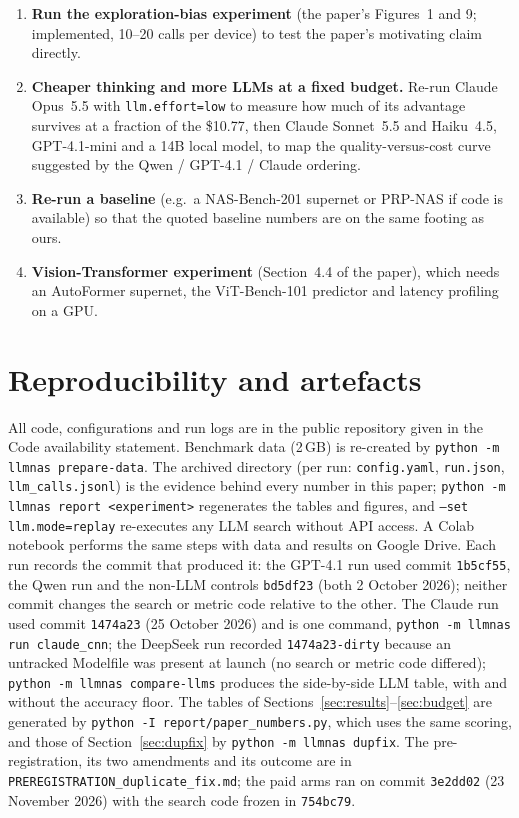 \documentclass[pdflatex,sn-mathphys-ay]{sn-jnl}
\newcommand{\code}[1]{\texttt{#1}}
\begin{document}
\begin{enumerate}
  \item \textbf{Run the exploration-bias experiment} (the paper's Figures~1 and 9; implemented, 10--20 calls per device) to test the paper's motivating claim directly.
  \item \textbf{Cheaper thinking and more LLMs at a fixed budget.} Re-run Claude Opus~5.5 with \code{llm.effort=low} to measure how much of its advantage survives at a fraction of the \$10.77, then Claude Sonnet~5.5 and Haiku~4.5, GPT-4.1-mini and a 14B local model, to map the quality-versus-cost curve suggested by the Qwen / GPT-4.1 / Claude ordering.
  \item \textbf{Re-run a baseline} (e.g.\ a NAS-Bench-201 supernet or PRP-NAS if code is available) so that the quoted baseline numbers are on the same footing as ours.
  \item \textbf{Vision-Transformer experiment} (Section~4.4 of the paper), which needs an AutoFormer supernet, the ViT-Bench-101 predictor and latency profiling on a GPU.
\end{enumerate}

\section{Reproducibility and artefacts}
All code, configurations and run logs are in the public repository given in the Code availability statement. Benchmark data (2\,GB) is re-created by \code{python -m llmnas prepare-data}. The archived  directory (per run: \code{config.yaml}, \code{run.json}, \code{llm\_calls.jsonl}) is the evidence behind every number in this paper; \code{python -m llmnas report <experiment>} regenerates the tables and figures, and \code{--set llm.mode=replay} re-executes any LLM search without API access. A Colab notebook performs the same steps with data and results on Google Drive. Each run records the commit that produced it: the GPT-4.1 run used commit \code{1b5cf55}, the Qwen run and the non-LLM controls \code{bd5df23} (both 2 October 2026); neither commit changes the search or metric code relative to the other. The Claude run used commit \code{1474a23} (25 October 2026) and is one command, \code{python -m llmnas run claude\_cnn}; the DeepSeek run recorded \code{1474a23-dirty} because an untracked Modelfile was present at launch (no search or metric code differed); \code{python -m llmnas compare-llms} produces the side-by-side LLM table, with and without the accuracy floor. The tables of Sections~\ref{sec:results}--\ref{sec:budget} are generated by \code{python -I report/paper\_numbers.py}, which uses the same scoring, and those of Section~\ref{sec:dupfix} by \code{python -m llmnas dupfix}. The pre-registration, its two amendments and its outcome are in \code{PREREGISTRATION\_duplicate\_fix.md}; the paid arms ran on commit \code{3e2dd02} (23 November 2026) with the search code frozen in \code{754bc79}.
\end{document}
